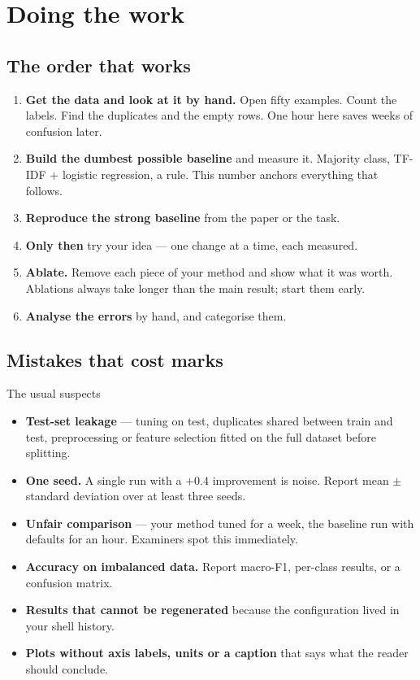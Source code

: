 \documentclass[11pt,a4paper]{article}
\begin{document}
\section{Doing the work}

\subsection{The order that works}

\begin{enumerate}
  \item \textbf{Get the data and look at it by hand.} Open fifty examples.
        Count the labels. Find the duplicates and the empty rows. One hour
        here saves weeks of confusion later.
  \item \textbf{Build the dumbest possible baseline} and measure it. Majority
        class, TF-IDF + logistic regression, a rule. This number anchors
        everything that follows.
  \item \textbf{Reproduce the strong baseline} from the paper or the task.
  \item \textbf{Only then} try your idea --- one change at a time, each
        measured.
  \item \textbf{Ablate.} Remove each piece of your method and show what it was
        worth. Ablations always take longer than the main result; start them
        early.
  \item \textbf{Analyse the errors} by hand, and categorise them.
\end{enumerate}

\subsection{Mistakes that cost marks}

\begin{wbox}{The usual suspects}
\begin{itemize}
  \item \textbf{Test-set leakage} --- tuning on test, duplicates shared between
        train and test, preprocessing or feature selection fitted on the full
        dataset before splitting.
  \item \textbf{One seed.} A single run with a $+0.4$ improvement is noise.
        Report mean $\pm$ standard deviation over at least three seeds.
  \item \textbf{Unfair comparison} --- your method tuned for a week, the
        baseline run with defaults for an hour. Examiners spot this
        immediately.
  \item \textbf{Accuracy on imbalanced data.} Report macro-F1, per-class
        results, or a confusion matrix.
  \item \textbf{Results that cannot be regenerated} because the configuration
        lived in your shell history.
  \item \textbf{Plots without axis labels, units or a caption} that says what
        the reader should conclude.
\end{itemize}
\end{wbox}
\end{document}
